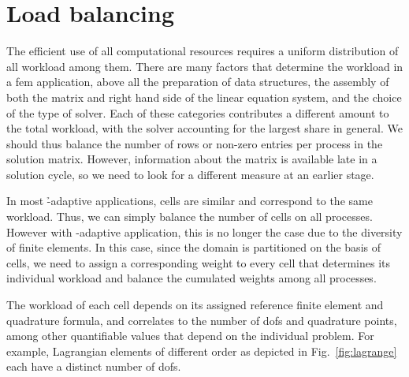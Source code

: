 \section{Load balancing}
\label{sec:balancing}

The efficient use of all computational resources requires a uniform distribution of all workload among them. There are many factors that determine the workload in a \gls{fem} application, above all the preparation of data structures, the assembly of both the matrix and right hand side of the linear equation system, and the choice of the type of solver. Each of these categories contributes a different amount to the total workload, with the solver accounting for the largest share in general. We should thus balance the number of rows or non-zero entries per process in the solution matrix. However, information about the matrix is available late in a solution cycle, so we need to look for a different measure at an earlier stage.

In most \h-adaptive applications, cells are similar and correspond to the same workload. Thus, we can simply balance the number of cells on all processes. However with \hp-adaptive application, this is no longer the case due to the diversity of finite elements. %
In this case, since the domain is partitioned on the basis of cells, we need to assign a corresponding weight to every cell that determines its individual workload and balance the cumulated weights among all processes.

The workload of each cell depends on its assigned reference finite element and quadrature formula, and correlates to the number of \glspl{dof} and quadrature points, among other quantifiable values that depend on the individual problem. For example, Lagrangian elements of different order as depicted in Fig.~\ref{fig:lagrange} each have a distinct number of \glspl{dof}.





